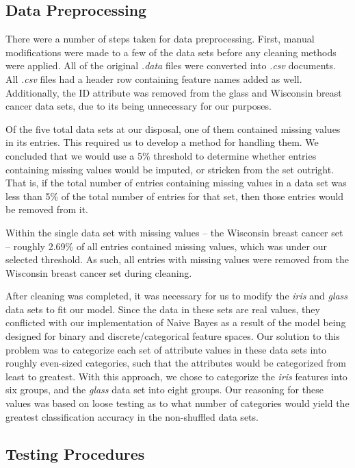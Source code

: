 \documentclass[twoside,11pt]{article}
\begin{document}
	\subsection{Data Preprocessing}\label{subsec:data-preprosessing}
	There were a number of steps taken for data preprocessing. First, manual modifications were made to a few of the data sets before any cleaning methods were applied. All of the original \textit{.data} files were converted into \textit{.csv} documents. All \textit{.csv} files had a header row containing feature names added as well. Additionally, the ID attribute was removed from the glass and Wisconsin breast cancer data sets, due to its being unnecessary for our purposes.
	
	Of the five total data sets at our disposal, one of them contained missing values in its entries. This required us to develop a method for handling them. We concluded that we would use a 5\% threshold to determine whether entries containing missing values would be imputed, or stricken from the set outright. That is, if the total number of entries containing missing values in a data set was less than 5\% of the total number of entries for that set, then those entries would be removed from it.

	Within the single data set with missing values -- the Wisconsin breast cancer set -- roughly 2.69\% of all entries contained missing values, which was under our selected threshold. As such, all entries with missing values were removed from the Wisconsin breast cancer set during cleaning.
	
	After cleaning was completed, it was necessary for us to modify the \textit{iris} and \textit{glass} data sets to fit our model. Since the data in these sets are real values, they conflicted with our implementation of Naive Bayes as a result of the model being designed for binary and discrete/categorical feature spaces. Our solution to this problem was to categorize each set of attribute values in these data sets into roughly even-sized categories, such that the attributes would be categorized from least to greatest. With this approach, we chose to categorize the \textit{iris} features into six groups, and the \textit{glass} data set into eight groups. Our reasoning for these values was based on loose testing as to what number of categories would yield the greatest classification accuracy in the non-shuffled data sets.

	\subsection{Testing Procedures}\label{subsec:testing-procedures}
	
\end{document}
